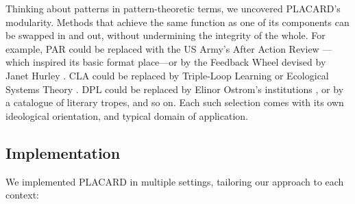 \documentclass[acmlarge,timestamp]{acmart}
\begin{document}
\medskip

Thinking about patterns in pattern-theoretic terms, we uncovered
PLACARD’s modularity.  Methods that achieve the same function as one
of its components can be swapped in and out, without undermining the
integrity of the whole.  For example, PAR could be replaced with the
US Army's After Action Review \cite{afteraction}---which inspired its
basic format place---or by the Feedback Wheel devised by Janet Hurley
\cite{real2008new}. CLA could be replaced by Triple-Loop Learning
\cite{tosey2012origins} or Ecological Systems Theory
\cite{bronfenbrenner-est}.  DPL could be replaced by Elinor Ostrom's
institutions \cite{Ostrom_1990}, or by a catalogue of literary tropes,
and so on.  Each such selection comes with its own ideological
orientation, and typical domain of application.

\subsection{Implementation}

{We implemented PLACARD in multiple settings, tailoring our
  approach to each context:}
\medskip
\end{document}
